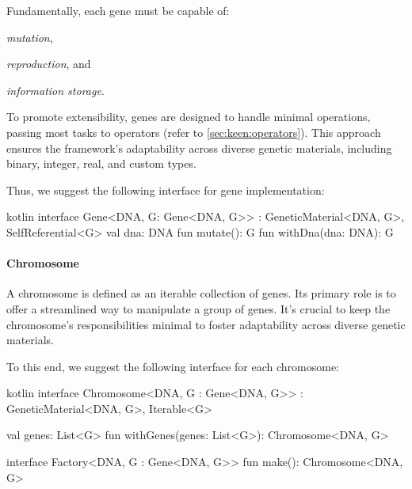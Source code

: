       Fundamentally, each gene must be capable of:
      \begin{enumerate*}
        \item \textit{mutation},
        \item \textit{reproduction}, and
        \item \textit{information storage}.
      \end{enumerate*}
      To promote extensibility, genes are designed to handle minimal 
      operations, passing most tasks to operators 
      (refer to \vref{sec:keen:operators}).
      This approach ensures the framework's adaptability across diverse 
      genetic materials, including binary, integer, real, and custom types.

      Thus, we suggest the following interface for gene implementation:

      \begin{code}{kotlin}
        interface Gene<DNA, G: Gene<DNA, G>> : GeneticMaterial<DNA, G>,
                                               SelfReferential<G> {
            val dna: DNA
            fun mutate(): G
            fun withDna(dna: DNA): G
        }
      \end{code}

    \paragraph{Chromosome}
      A chromosome is defined as an iterable collection of genes.
      Its primary role is to offer a streamlined way to manipulate a group 
      of genes.
      It's crucial to keep the chromosome's responsibilities minimal to 
      foster adaptability across diverse genetic materials.
      
      To this end, we suggest the following interface for each chromosome:
      
      \begin{code}{kotlin}
        interface Chromosome<DNA, G : Gene<DNA, G>> : GeneticMaterial<DNA, G>, 
                                                      Iterable<G> {
            val genes: List<G>
            fun withGenes(genes: List<G>): Chromosome<DNA, G>
      
            interface Factory<DNA, G : Gene<DNA, G>> {
                fun make(): Chromosome<DNA, G>
            }
        }
      \end{code}
      
